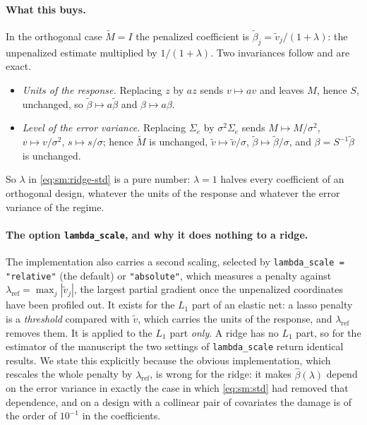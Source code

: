 \documentclass[11pt]{article}
\begin{document}
\paragraph{What this buys.} In the orthogonal case $\tilde M = I$ the penalized coefficient is $\tilde\beta_j = \tilde v_j/(1+\lambda)$: the unpenalized estimate multiplied by $1/(1+\lambda)$. Two invariances follow and are exact.
\begin{itemize}[leftmargin=1.4em,itemsep=2pt,topsep=3pt]
  \item \emph{Units of the response.} Replacing $z$ by $a z$ sends $v \mapsto a v$ and leaves $M$, hence $S$, unchanged, so $\tilde\beta \mapsto a\tilde\beta$ and $\beta \mapsto a\beta$.
  \item \emph{Level of the error variance.} Replacing $\Sigma_e$ by $\sigma^2\Sigma_e$ sends $M \mapsto M/\sigma^2$, $v \mapsto v/\sigma^2$, $s \mapsto s/\sigma$; hence $\tilde M$ is unchanged, $\tilde v \mapsto \tilde v/\sigma$, $\tilde\beta \mapsto \tilde\beta/\sigma$, and $\beta = S^{-1}\tilde\beta$ is unchanged.
\end{itemize}
So $\lambda$ in \eqref{eq:sm:ridge-std} is a pure number: $\lambda = 1$ halves every coefficient of an orthogonal design, whatever the units of the response and whatever the error variance of the regime.

\paragraph{The option \texttt{lambda\_scale}, and why it does nothing to a ridge.} The implementation also carries a second scaling, selected by \texttt{lambda\_scale = "relative"} (the default) or \texttt{"absolute"}, which measures a penalty against $\lambda_{\mathrm{ref}} = \max_j|\tilde v_j|$, the largest partial gradient once the unpenalized coordinates have been profiled out. It exists for the $L_1$ part of an elastic net: a lasso penalty is a \emph{threshold} compared with $\tilde v$, which carries the units of the response, and $\lambda_{\mathrm{ref}}$ removes them. It is applied to the $L_1$ part \emph{only}. A ridge has no $L_1$ part, so for the estimator of the manuscript the two settings of \texttt{lambda\_scale} return identical results. We state this explicitly because the obvious implementation, which rescales the whole penalty by $\lambda_{\mathrm{ref}}$, is wrong for the ridge: it makes $\hat\beta(\lambda)$ depend on the error variance in exactly the case in which \eqref{eq:sm:std} had removed that dependence, and on a design with a collinear pair of covariates the damage is of the order of $10^{-1}$ in the coefficients.
\end{document}
